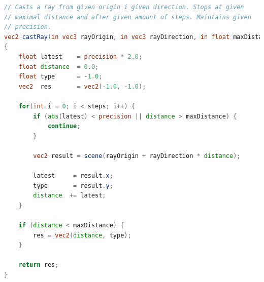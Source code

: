 \begin{lstlisting}[language=GLSL,caption={Umsetzung des Sphere Tracings in
        GLSL.},label={alg:glsl_sphere_tracing},captionpos=b,emph={castRay}]
// Casts a ray from given origin i given direction. Stops at given
// maximal distance and after given amount of steps. Maintains given
// precision.
vec2 castRay(in vec3 rayOrigin, in vec3 rayDirection, in float maxDistance, in float precision, in int steps)
{
    float latest    = precision * 2.0;
    float distance  = 0.0;
    float type      = -1.0;
    vec2  res       = vec2(-1.0, -1.0);

    for(int i = 0; i < steps; i++) {
        if (abs(latest) < precision || distance > maxDistance) {
            continue;
        }

        vec2 result = scene(rayOrigin + rayDirection * distance);

        latest     = result.x;
        type       = result.y;
        distance  += latest;
    }

    if (distance < maxDistance) {
        res = vec2(distance, type);
    }

    return res;
}
\end{lstlisting}

